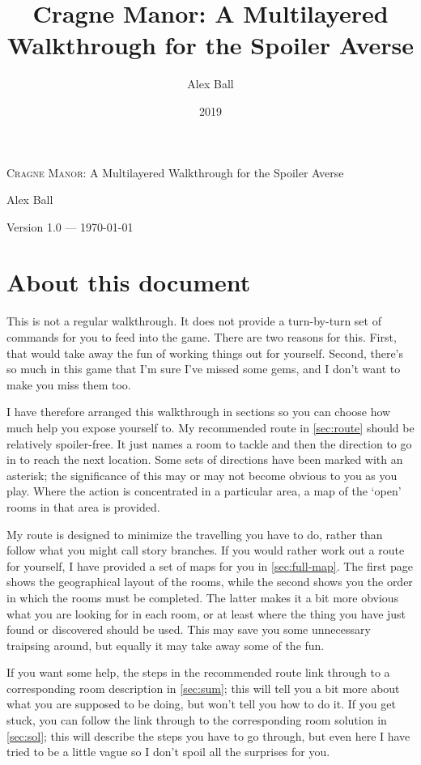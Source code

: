 \documentclass[a5paper]{extarticle}
\title{Cragne Manor: A Multilayered Walkthrough for the Spoiler Averse}
\author{Alex Ball}
\date{2019}
\begin{document}
\thispagestyle{empty}
\begin{center}
\huge\textsc{Cragne Manor:} A Multilayered Walkthrough for the Spoiler Averse\par

\Large Alex Ball\par
\end{center}
{\centering\Large Version 1.0 --- \today\par}
\newpage

\tableofcontents

\newpage
\section{About this document}\label{sec:about}

This is not a regular walkthrough.
It does not provide a turn-by-turn set of commands for you to feed into the game.
There are two reasons for this.
First, that would take away the fun of working things out for yourself.
Second, there's so much in this game that I'm sure I've missed some gems,
and I don't want to make you miss them too.

I have therefore arranged this walkthrough in sections so you can choose how much help you expose yourself to.
My recommended route in \cref{sec:route} should be relatively spoiler-free.
It just names a room to tackle and then the direction to go in to reach the next location.
Some sets of directions have been marked with an asterisk;
the significance of this may or may not become obvious to you as you play.
Where the action is concentrated in a particular area,
a map of the ‘open’ rooms in that area is provided.

My route is designed to minimize the travelling you have to do,
rather than follow what you might call story branches.
If you would rather work out a route for yourself,
I have provided a set of maps for you in \cref{sec:full-map}.
The first page shows the geographical layout of the rooms,
while the second shows you the order in which the rooms must be completed.
The latter makes it a bit more obvious what you are looking for in each room,
or at least where the thing you have just found or discovered should be used.
This may save you some unnecessary traipsing around,
but equally it may take away some of the fun.

If you want some help, the steps in the recommended route link through to a
corresponding room description in \cref{sec:sum};
this will tell you a bit more about what you are supposed to be doing,
but won't tell you how to do it.
If you get stuck, you can follow the link through to the corresponding room solution in \cref{sec:sol};
this will describe the steps you have to go through,
but even here I have tried to be a little vague so I don't spoil all the surprises for you.
\end{document}
